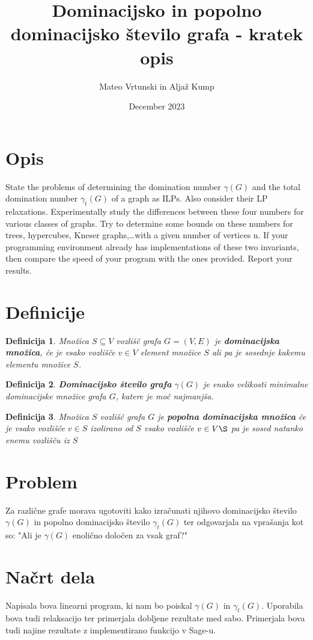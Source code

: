 \documentclass[a4paper,12pt]{article}
\newtheorem{definition}{Definicija}
\begin{document}
\author{Mateo Vrtunski in Aljaž Kump}
\date{December 2023}
\title{Dominacijsko in popolno dominacijsko število grafa - kratek opis}
\maketitle

\section{Opis}

State the problems of determining the domination number $\gamma (G)$ and the total domination number $\gamma_t (G)$ of a graph as ILPs. Also consider their LP relaxations.
Experimentally study the differences between these four numbers for various classes of graphs.
Try to determine some bounds on these numbers for trees, hypercubes, Kneser graphs,\ldots  with
a given number of vertices n. If your programming environment already has implementations of
these two invariants, then compare the speed of your program with the ones provided. Report your results.

\section{Definicije}

    \begin{definition}
       Množica $S\subseteq V$ vozlišč grafa $G = (V,E)$ je \textbf{dominacijska množica}, če je vsako vozlišče $v \in  V$ element množice $S$ ali pa je sosednje kakemu elementu množice $S$.
    \end{definition}

    \begin{definition}
        \textbf{Dominacijsko število grafa} $\gamma(G)$ je enako velikosti minimalne dominacijske množice grafa $G$, katere je moč najmanjša. 
    \end{definition}

    \begin{definition}
        Množica $S$ vozlišč grafa $G$ je \textbf{popolna dominacijska množica} če je vsako vozlišče $v \in  S$ izolirano od $S$ vsako vozlišče $v \in V\S$ pa je sosed natanko enemu vozlišču iz $S$
    \end{definition}
\pagebreak

\section{Problem} 
    Za različne grafe morava ugotoviti kako izračunati njihovo dominacijsko število $\gamma(G)$ in popolno dominacijsko število  $\gamma_t (G)$ ter odgovarjala na vprašanja kot so:  "Ali je $\gamma(G)$ enolično določen za vsak graf?"
    
\section{Načrt dela}
    Napisala bova linearni program, ki nam bo poiskal $\gamma(G)$ in $\gamma_t (G)$. Uporabila bova tudi relaksacijo ter primerjala dobljene rezultate med sabo. 
    Primerjala bova tudi najine rezultate z implementirano funkcijo v Sage-u.
\end{document}
